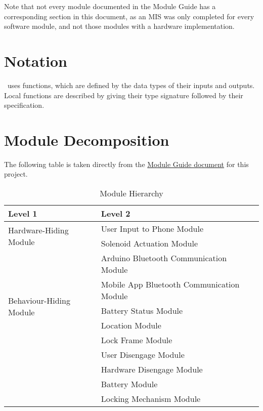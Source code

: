 \documentclass[12pt, titlepage]{article}
\begin{document}
Note that not every module documented in the Module Guide has a corresponding section in this document, as an MIS was only completed for every software module, and not those modules with a hardware implementation. 

\section{Notation}

\progname \ uses functions, which
are defined by the data types of their inputs and outputs. Local functions are
described by giving their type signature followed by their specification.

\section{Module Decomposition}

The following table is taken directly from the \href{https://github.com/NevoAbigail/Capstone/blob/main/docs/Design/SoftArchitecture/MG.pdf}{Module Guide document} for this project.

\begin{table}[h!]
\centering
\begin{tabular}{p{} p{}}
\toprule
\textbf{Level 1} & \textbf{Level 2}\\
\midrule

\multirow{2}{0.3\textwidth}{Hardware-Hiding Module} & User Input to Phone Module \\
& Solenoid Actuation Module \\
\midrule

\multirow{6}{0.3\textwidth}{Behaviour-Hiding Module} %
& Arduino Bluetooth Communication Module\\
& Mobile App Bluetooth Communication Module\\
& Battery Status Module \\
& Location Module  \\
& Lock Frame Module \\
\midrule

\multirow{5}{0.3\textwidth}{Software Decision Module} & User Disengage Module \\
& Hardware Disengage Module \\
& Battery Module \\
& Locking Mechanism Module \\
\bottomrule

\end{tabular}
\caption{Module Hierarchy}
\label{TblMH}
\end{table}
\end{document}
